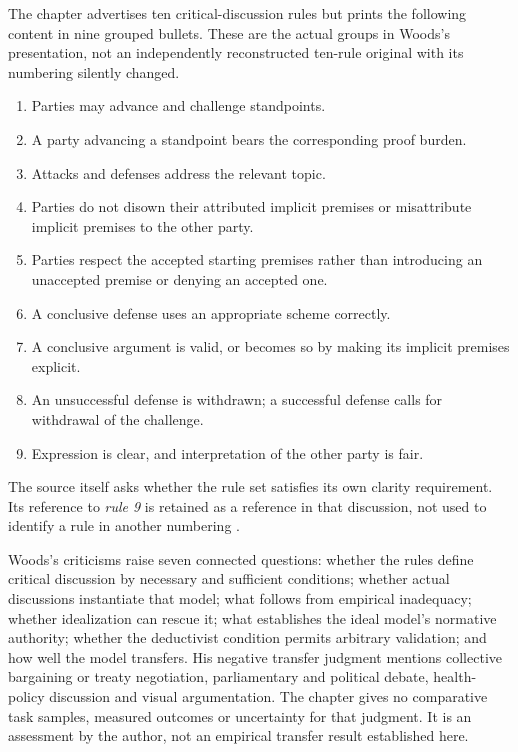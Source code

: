 The chapter advertises ten critical-discussion rules but prints the
following content in nine grouped bullets. These are the actual groups
in Woods's presentation, not an independently reconstructed ten-rule
original with its numbering silently changed.
\begin{enumerate}
\item Parties may advance and challenge standpoints.
\item A party advancing a standpoint bears the corresponding proof burden.
\item Attacks and defenses address the relevant topic.
\item Parties do not disown their attributed implicit premises or
      misattribute implicit premises to the other party.
\item Parties respect the accepted starting premises rather than
      introducing an unaccepted premise or denying an accepted one.
\item A conclusive defense uses an appropriate scheme correctly.
\item A conclusive argument is valid, or becomes so by making its
      implicit premises explicit.
\item An unsuccessful defense is withdrawn; a successful defense calls
      for withdrawal of the challenge.
\item Expression is clear, and interpretation of the other party is fair.
\end{enumerate}
The source itself asks whether the rule set satisfies its own clarity
requirement. Its reference to \emph{rule 9} is retained as a reference in
that discussion, not used to identify a rule in another numbering
\cite[p.~372]{Woods2021ReasoningArgumentation}.

Woods's criticisms raise seven connected questions: whether the rules
define critical discussion by necessary and sufficient conditions;
whether actual discussions instantiate that model; what follows from
empirical inadequacy; whether idealization can rescue it; what establishes
the ideal model's normative authority; whether the deductivist condition
permits arbitrary validation; and how well the model transfers. His
negative transfer judgment mentions collective bargaining or treaty
negotiation, parliamentary and political debate, health-policy discussion
and visual argumentation. The chapter gives no comparative task samples,
measured outcomes or uncertainty for that judgment. It is an assessment
by the author, not an empirical transfer result established here.

